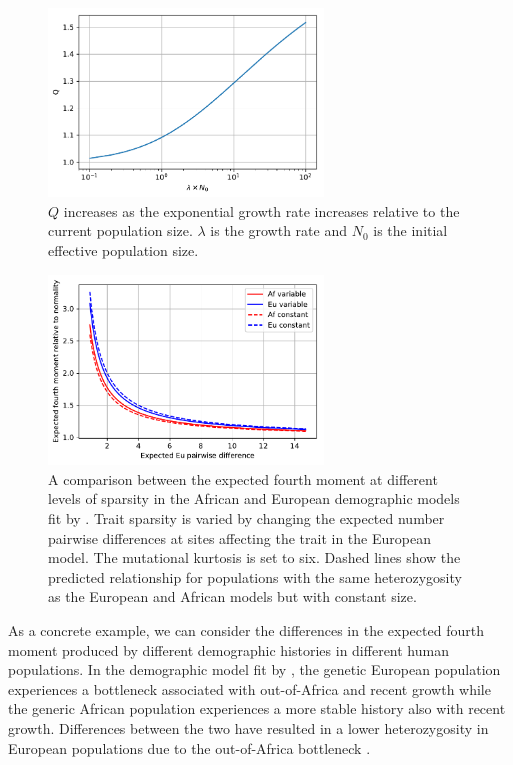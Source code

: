 \begin{figure}
\centering
\includegraphics[width=0.65\textwidth]{figures/exp_growth.pdf}
\caption{$Q$ increases as the exponential growth rate increases relative to the current
population size. $\lambda$ is the growth rate and $N_0$ is the initial effective
population size.}
\label{fig:Qexp}
\end{figure}

\begin{figure}
\centering
\includegraphics[width=0.65\textwidth]{figures/af_eu_mom4.pdf}
\caption{A comparison between the expected fourth moment at different levels of sparsity in the African and European demographic models fit by \citet{Tennessen2012}. Trait sparsity is varied by changing the expected
number pairwise differences at sites affecting the trait in the European model.
The mutational kurtosis is set to six. Dashed lines show the predicted
relationship for populations with the same heterozygosity as the European and
African models but with constant size.}
\label{fig:afeucomp}
\end{figure}

As a concrete example, we can consider the differences in the expected fourth
moment produced by different demographic histories in different human
populations. In the demographic model fit by \citet{Tennessen2012}, the genetic
European population experiences a bottleneck associated with out-of-Africa and
recent growth while the generic African population experiences a more stable
history also with recent growth. Differences between the two have resulted in a
lower heterozygosity in European populations due to the out-of-Africa
bottleneck \citep{Yu2002}.

